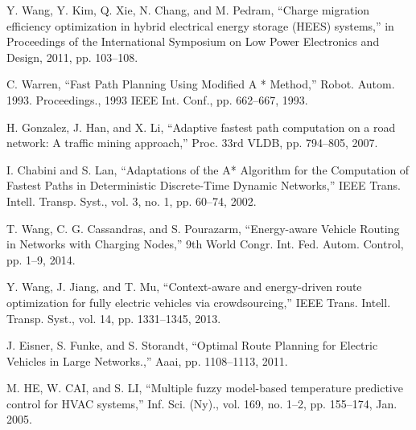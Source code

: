 	Y. Wang, Y. Kim, Q. Xie, N. Chang, and M. Pedram, ``Charge migration efficiency optimization in hybrid electrical energy storage (HEES) systems,'' in Proceedings of the International Symposium on Low Power Electronics and Design, 2011, pp. 103–108.

	C. Warren, ``Fast Path Planning Using Modified A * Method,'' Robot. Autom. 1993. Proceedings., 1993 IEEE Int. Conf., pp. 662–667, 1993.

	H. Gonzalez, J. Han, and X. Li, ``Adaptive fastest path computation on a road network: A traffic mining approach,'' Proc. 33rd VLDB, pp. 794–805, 2007.

	I. Chabini and S. Lan, ``Adaptations of the A* Algorithm for the Computation of Fastest Paths in Deterministic Discrete-Time Dynamic Networks,'' IEEE Trans. Intell. Transp. Syst., vol. 3, no. 1, pp. 60–74, 2002.


	T. Wang, C. G. Cassandras, and S. Pourazarm, ``Energy-aware Vehicle Routing in Networks with Charging Nodes,'' 9th World Congr. Int. Fed. Autom. Control, pp. 1–9, 2014.


	Y. Wang, J. Jiang, and T. Mu, ``Context-aware and energy-driven route optimization for fully electric vehicles via crowdsourcing,'' IEEE Trans. Intell. Transp. Syst., vol. 14, pp. 1331–1345, 2013.


	J. Eisner, S. Funke, and S. Storandt, ``Optimal Route Planning for Electric Vehicles in Large Networks.,'' Aaai, pp. 1108–1113, 2011.


	M. HE, W. CAI, and S. LI, ``Multiple fuzzy model-based temperature predictive control for HVAC systems,'' Inf. Sci. (Ny)., vol. 169, no. 1–2, pp. 155–174, Jan. 2005.

